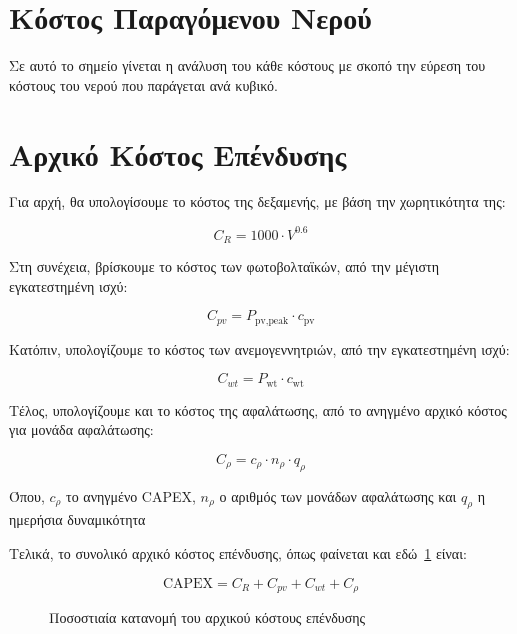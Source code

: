 \section{Κόστος Παραγόμενου Νερού}

Σε αυτό το σημείο γίνεται η ανάλυση του κάθε κόστους με σκοπό την εύρεση του
κόστους του νερού που παράγεται ανά κυβικό.

\section{Αρχικό Κόστος Επένδυσης}

Για αρχή, θα υπολογίσουμε το κόστος της δεξαμενής, με βάση την χωρητικότητα της:

\begin{equation}\label{eq:tank_cost}
	C_R = 1000 \cdot V^{0.6}
\end{equation}

Στη συνέχεια, βρίσκουμε το κόστος των φωτοβολταϊκών, από την μέγιστη εγκατεστημένη ισχύ:

\begin{equation}\label{eq:pv_cost}
	C_{pv}= P_{\text{pv,peak}}\cdot c_{\text{pv}}
\end{equation}

Κατόπιν, υπολογίζουμε το κόστος των ανεμογεννητριών, από την εγκατεστημένη ισχύ:

\begin{equation}\label{eq:wt_cost}
	C_{wt}= P_{\text{wt}}\cdot c_{\text{wt}}
\end{equation}

Τέλος, υπολογίζουμε και το κόστος της αφαλάτωσης, από το ανηγμένο αρχικό κόστος
για μονάδα αφαλάτωσης:

\begin{equation}\label{eq:desalination_cost}
	C_{\rho}= c_{\rho} \cdot n_{\rho} \cdot q_{\rho}
\end{equation}

Όπου, \(c_{\rho}\) το ανηγμένο CAPEX, \(n_{\rho}\) ο αριθμός των μονάδων
αφαλάτωσης και \(q_{\rho}\) η ημερήσια δυναμικότητα

Τελικά, το συνολικό αρχικό κόστος επένδυσης, όπως φαίνεται και εδώ~\ref{fig:CAPEX} είναι:

\begin{equation}\label{eq:total_CAPEX}
	\text{CAPEX} = C_R + C_{pv} + C_{wt} + C_{\rho}
\end{equation}

\begin{figure}[ht]
	\centering
	\caption{Ποσοστιαία κατανομή του αρχικού κόστους επένδυσης}\label{fig:CAPEX}
\end{figure}

